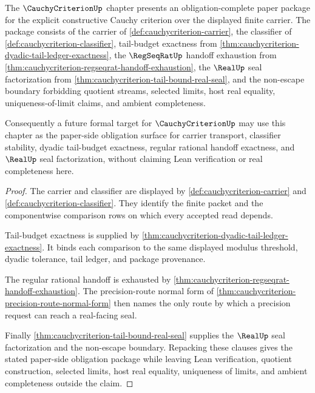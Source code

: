 \begin{theorem}
\label{thm:cauchycriterion-obligation-closure-package}
The $\CauchyCriterionUp$ chapter presents an obligation-complete paper package for the explicit constructive Cauchy criterion over the displayed finite carrier. The package consists of the carrier of \autoref{def:cauchycriterion-carrier}, the classifier of \autoref{def:cauchycriterion-classifier}, tail-budget exactness from \autoref{thm:cauchycriterion-dyadic-tail-ledger-exactness}, the $\RegSeqRatUp$ handoff exhaustion from \autoref{thm:cauchycriterion-regseqrat-handoff-exhaustion}, the $\RealUp$ seal factorization from \autoref{thm:cauchycriterion-tail-bound-real-seal}, and the non-escape boundary forbidding quotient streams, selected limits, host real equality, uniqueness-of-limit claims, and ambient completeness.

Consequently a future formal target for $\CauchyCriterionUp$ may use this chapter as the paper-side obligation surface for carrier transport, classifier stability, dyadic tail-budget exactness, regular rational handoff exactness, and $\RealUp$ seal factorization, without claiming Lean verification or real completeness here.
\end{theorem}
\begin{proof}
The carrier and classifier are displayed by \autoref{def:cauchycriterion-carrier} and \autoref{def:cauchycriterion-classifier}. They identify the finite packet and the componentwise comparison rows on which every accepted read depends.

Tail-budget exactness is supplied by \autoref{thm:cauchycriterion-dyadic-tail-ledger-exactness}. It binds each comparison to the same displayed modulus threshold, dyadic tolerance, tail ledger, and package provenance.

The regular rational handoff is exhausted by \autoref{thm:cauchycriterion-regseqrat-handoff-exhaustion}. The precision-route normal form of \autoref{thm:cauchycriterion-precision-route-normal-form} then names the only route by which a precision request can reach a real-facing seal.

Finally \autoref{thm:cauchycriterion-tail-bound-real-seal} supplies the $\RealUp$ seal factorization and the non-escape boundary. Repacking these clauses gives the stated paper-side obligation package while leaving Lean verification, quotient construction, selected limits, host real equality, uniqueness of limits, and ambient completeness outside the claim.
\end{proof}


